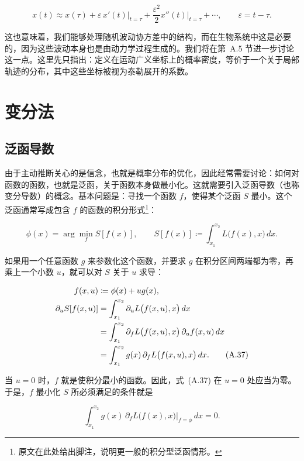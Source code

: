 \begin{equation}
x(t)
\approx
x(\tau)
+ \varepsilon \, x'(t)\big|_{t=\tau}
+ \frac{\varepsilon^2}{2} x''(t)\big|_{t=\tau}
+ \cdots,
\qquad
\varepsilon = t-\tau.
\tag{A.35}
\end{equation}

这也意味着，我们能够处理随机波动协方差中的结构，而在生物系统中这是必要的，因为这些波动本身也是由动力学过程生成的。我们将在第~A.5 节进一步讨论这一点。这里先只指出：定义在运动广义坐标上的概率密度，等价于一个关于局部轨迹的分布，其中这些坐标被视为泰勒展开的系数。

\section{变分法}

\subsection{泛函导数}

由于主动推断关心的是信念，也就是概率分布的优化，因此经常需要讨论：如何对函数的函数，也就是泛函，关于函数本身做最小化。这就需要引入泛函导数（也称变分导数）的概念。基本问题是：寻找一个函数 $f$，使得某个泛函 $S$ 最小。这个泛函通常写成包含 $f$ 的函数的积分形式\footnote{原文在此处给出脚注，说明更一般的积分型泛函情形。}：

\begin{equation}
\phi(x) = \arg\min_f S[f(x)],
\qquad
S[f(x)] \coloneqq \int_{x_1}^{x_2} L\bigl(f(x),x\bigr)\,dx.
\tag{A.36}
\end{equation}

如果用一个任意函数 $g$ 来参数化这个函数，并要求 $g$ 在积分区间两端都为零，再乘上一个小数 $u$，就可以对 $S$ 关于 $u$ 求导：

\begin{align}
f(x,u) &\coloneqq \phi(x) + u g(x),
\notag \\
\partial_u S[f(x,u)]
&=
\int_{x_1}^{x_2} \partial_u L\bigl(f(x,u),x\bigr)\,dx
\notag \\
&=
\int_{x_1}^{x_2}
\partial_{f}L\bigl(f(x,u),x\bigr)\,
\partial_u f(x,u)\,dx
\notag \\
&=
\int_{x_1}^{x_2}
g(x)\,\partial_f L\bigl(f(x,u),x\bigr)\,dx.
\tag{A.37}
\end{align}

当 $u=0$ 时，$f$ 就是使积分最小的函数。因此，式~(A.37) 在 $u=0$ 处应当为零。于是，$f$ 最小化 $S$ 所必须满足的条件就是

\begin{equation}
\int_{x_1}^{x_2}
g(x)\,\partial_f L\bigl(f(x),x\bigr)\big|_{f=\phi}
\,dx
= 0.
\tag{A.38}
\end{equation}


